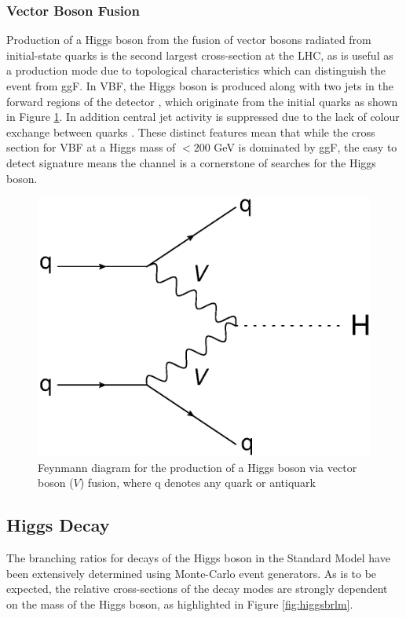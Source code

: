 		\subsubsection{Vector Boson Fusion}
		
			Production of a Higgs boson from the fusion of vector bosons radiated from initial-state quarks is the second largest cross-section at the LHC, as is useful as a production mode due to topological characteristics which can distinguish the event from ggF. In VBF, the Higgs boson is produced along with two jets in the forward regions of the detector , which originate from the initial quarks as shown in Figure \ref{fig:vbf}. In addition central jet activity is suppressed due to the lack of colour exchange between quarks \cite{VBF2004}.  These distinct features mean that while the cross section for VBF at a Higgs mass of $< 200$ GeV is dominated by ggF, the easy to detect signature means the channel is a cornerstone of searches for the Higgs boson.
		
					\begin{figure}[h]
						\centering
						\includegraphics[width=0.4\linewidth]{T/FIGS/vbf}
						\caption{Feynmann diagram for the production of a Higgs boson via vector boson ($V$) fusion, where q denotes any quark or antiquark}
						\label{fig:vbf}
					\end{figure}
						
	\subsection{Higgs Decay} 
	
		The branching ratios for decays of the Higgs boson in the Standard Model have been extensively determined using Monte-Carlo event generators. As is to be expected, the relative cross-sections of the decay modes are strongly dependent on the mass of the Higgs boson, as highlighted in Figure \ref{fig:higgsbrlm}. 
	
